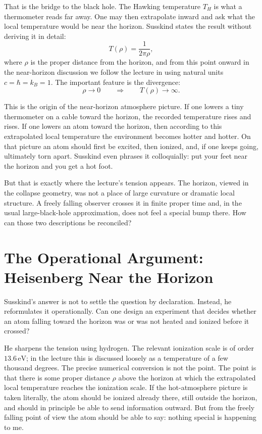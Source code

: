 That is the bridge to the black hole. The Hawking temperature \(T_H\) is what a thermometer reads far away. One may then extrapolate inward and ask what the local temperature would be near the horizon. Susskind states the result without deriving it in detail:
\begin{equation}
T(\rho)=\frac{1}{2\pi \rho},
\end{equation}
where \(\rho\) is the proper distance from the horizon, and from this point onward in the near-horizon discussion we follow the lecture in using natural units \(c=\hbar=k_B=1\). The important feature is the divergence:
\begin{equation}
\rho\to 0
\qquad \Longrightarrow \qquad
T(\rho)\to \infty.
\end{equation}

This is the origin of the near-horizon atmosphere picture. If one lowers a tiny thermometer on a cable toward the horizon, the recorded temperature rises and rises. If one lowers an atom toward the horizon, then according to this extrapolated local temperature the environment becomes hotter and hotter. On that picture an atom should first be excited, then ionized, and, if one keeps going, ultimately torn apart. Susskind even phrases it colloquially: put your feet near the horizon and you get a hot foot.

But that is exactly where the lecture's tension appears. The horizon, viewed in the collapse geometry, was not a place of large curvature or dramatic local structure. A freely falling observer crosses it in finite proper time and, in the usual large-black-hole approximation, does not feel a special bump there. How can those two descriptions be reconciled?

\section{The Operational Argument: Heisenberg Near the Horizon}

Susskind's answer is not to settle the question by declaration. Instead, he reformulates it operationally. Can one design an experiment that decides whether an atom falling toward the horizon was or was not heated and ionized before it crossed?

He sharpens the tension using hydrogen. The relevant ionization scale is of order \(13.6\,\mathrm{eV}\); in the lecture this is discussed loosely as a temperature of a few thousand degrees. The precise numerical conversion is not the point. The point is that there is some proper distance \(\rho\) above the horizon at which the extrapolated local temperature reaches the ionization scale. If the hot-atmosphere picture is taken literally, the atom should be ionized already there, still outside the horizon, and should in principle be able to send information outward. But from the freely falling point of view the atom should be able to say: nothing special is happening to me.

